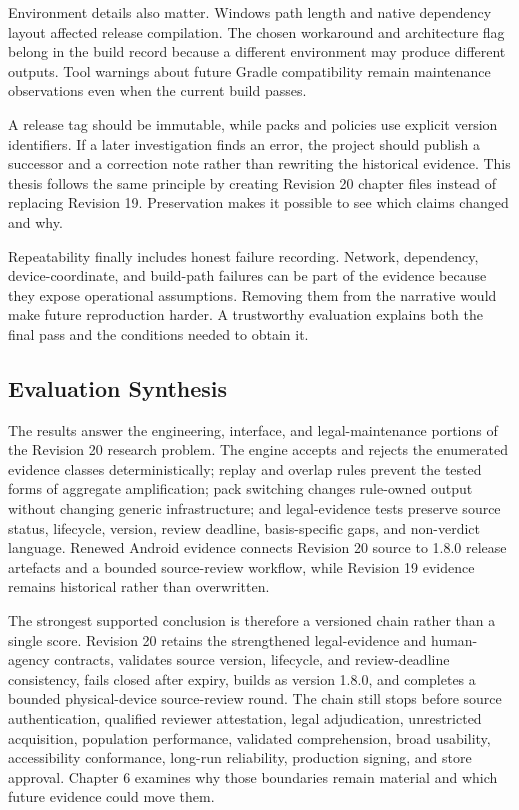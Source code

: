 Environment details also matter. Windows path length and native dependency layout affected release compilation. The chosen workaround and architecture flag belong in the build record because a different environment may produce different outputs. Tool warnings about future Gradle compatibility remain maintenance observations even when the current build passes.

A release tag should be immutable, while packs and policies use explicit version identifiers. If a later investigation finds an error, the project should publish a successor and a correction note rather than rewriting the historical evidence. This thesis follows the same principle by creating Revision 20 chapter files instead of replacing Revision 19. Preservation makes it possible to see which claims changed and why.

Repeatability finally includes honest failure recording. Network, dependency, device-coordinate, and build-path failures can be part of the evidence because they expose operational assumptions. Removing them from the narrative would make future reproduction harder. A trustworthy evaluation explains both the final pass and the conditions needed to obtain it.

\subsection{Evaluation Synthesis}

The results answer the engineering, interface, and legal-maintenance portions of the Revision 20 research problem. The engine accepts and rejects the enumerated evidence classes deterministically; replay and overlap rules prevent the tested forms of aggregate amplification; pack switching changes rule-owned output without changing generic infrastructure; and legal-evidence tests preserve source status, lifecycle, version, review deadline, basis-specific gaps, and non-verdict language. Renewed Android evidence connects Revision 20 source to 1.8.0 release artefacts and a bounded source-review workflow, while Revision 19 evidence remains historical rather than overwritten.

The strongest supported conclusion is therefore a versioned chain rather than a single score. Revision 20 retains the strengthened legal-evidence and human-agency contracts, validates source version, lifecycle, and review-deadline consistency, fails closed after expiry, builds as version 1.8.0, and completes a bounded physical-device source-review round. The chain still stops before source authentication, qualified reviewer attestation, legal adjudication, unrestricted acquisition, population performance, validated comprehension, broad usability, accessibility conformance, long-run reliability, production signing, and store approval. Chapter 6 examines why those boundaries remain material and which future evidence could move them.
